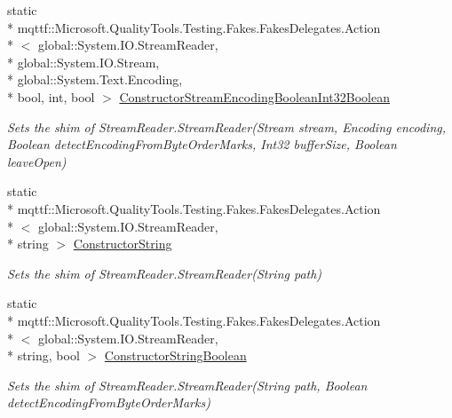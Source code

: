 \begin{DoxyCompactItemize}
static \\*
mqttf\-::\-Microsoft.\-Quality\-Tools.\-Testing.\-Fakes.\-Fakes\-Delegates.\-Action\\*
$<$ global\-::\-System.\-I\-O.\-Stream\-Reader, \\*
global\-::\-System.\-I\-O.\-Stream, \\*
global\-::\-System.\-Text.\-Encoding, \\*
bool, int, bool $>$ \hyperlink{class_system_1_1_i_o_1_1_fakes_1_1_shim_stream_reader_aee56d8e3042fecfaaacde708af702fc9}{Constructor\-Stream\-Encoding\-Boolean\-Int32\-Boolean}
\begin{DoxyCompactList}\small\item\em Sets the shim of Stream\-Reader.\-Stream\-Reader(\-Stream stream, Encoding encoding, Boolean detect\-Encoding\-From\-Byte\-Order\-Marks, Int32 buffer\-Size, Boolean leave\-Open)\end{DoxyCompactList}\item 
static \\*
mqttf\-::\-Microsoft.\-Quality\-Tools.\-Testing.\-Fakes.\-Fakes\-Delegates.\-Action\\*
$<$ global\-::\-System.\-I\-O.\-Stream\-Reader, \\*
string $>$ \hyperlink{class_system_1_1_i_o_1_1_fakes_1_1_shim_stream_reader_a8c57f9a13cf380c232e4f021d4e05642}{Constructor\-String}
\begin{DoxyCompactList}\small\item\em Sets the shim of Stream\-Reader.\-Stream\-Reader(\-String path)\end{DoxyCompactList}\item 
static \\*
mqttf\-::\-Microsoft.\-Quality\-Tools.\-Testing.\-Fakes.\-Fakes\-Delegates.\-Action\\*
$<$ global\-::\-System.\-I\-O.\-Stream\-Reader, \\*
string, bool $>$ \hyperlink{class_system_1_1_i_o_1_1_fakes_1_1_shim_stream_reader_a245fd38f3c291e28cebff251c739f10e}{Constructor\-String\-Boolean}
\begin{DoxyCompactList}\small\item\em Sets the shim of Stream\-Reader.\-Stream\-Reader(\-String path, Boolean detect\-Encoding\-From\-Byte\-Order\-Marks)\end{DoxyCompactList}\item 

\end{DoxyCompactItemize}
